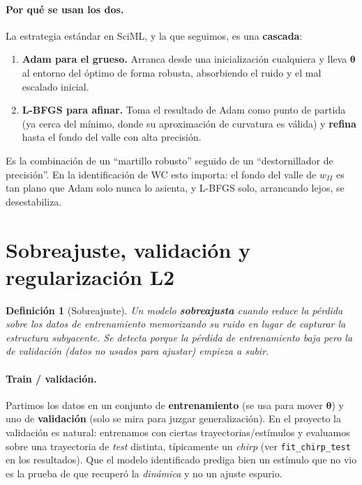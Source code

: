 \documentclass[11pt,a4paper]{article}
\newtheorem{definition}{Definición}
\newcommand{\thetavec}{\bm{\theta}}
\begin{document}
\paragraph{Por qué se usan los dos.} La estrategia estándar en SciML, y la que seguimos, es una \textbf{cascada}:
\begin{enumerate}[nosep]
  \item \textbf{Adam para el grueso.} Arranca desde una inicialización cualquiera y lleva $\thetavec$ al entorno del óptimo de forma robusta, absorbiendo el ruido y el mal escalado inicial.
  \item \textbf{L-BFGS para afinar.} Toma el resultado de Adam como punto de partida (ya cerca del mínimo, donde su aproximación de curvatura es válida) y \textbf{refina} hasta el fondo del valle con alta precisión.
\end{enumerate}
Es la combinación de un ``martillo robusto'' seguido de un ``destornillador de precisión''. En la identificación de WC esto importa: el fondo del valle de $w_{II}$ es tan plano que Adam solo nunca lo asienta, y L-BFGS solo, arrancando lejos, se desestabiliza.

\section{Sobreajuste, validación y regularización L2}
\label{sec:overfit}

\begin{definition}[Sobreajuste]
Un modelo \textbf{sobreajusta} cuando reduce la pérdida sobre los datos de entrenamiento memorizando su ruido en lugar de capturar la estructura subyacente. Se detecta porque la pérdida de \emph{entrenamiento} baja pero la de \emph{validación} (datos no usados para ajustar) empieza a subir.
\end{definition}

\paragraph{Train / validación.} Partimos los datos en un conjunto de \textbf{entrenamiento} (se usa para mover $\thetavec$) y uno de \textbf{validación} (solo se mira para juzgar generalización). En el proyecto la validación es natural: entrenamos con ciertas trayectorias/estímulos y evaluamos sobre una trayectoria de \emph{test} distinta, típicamente un \emph{chirp} (ver \texttt{fit\_chirp\_test} en los resultados). Que el modelo identificado prediga bien un estímulo que no vio es la prueba de que recuperó la \emph{dinámica} y no un ajuste espurio.
\end{document}
